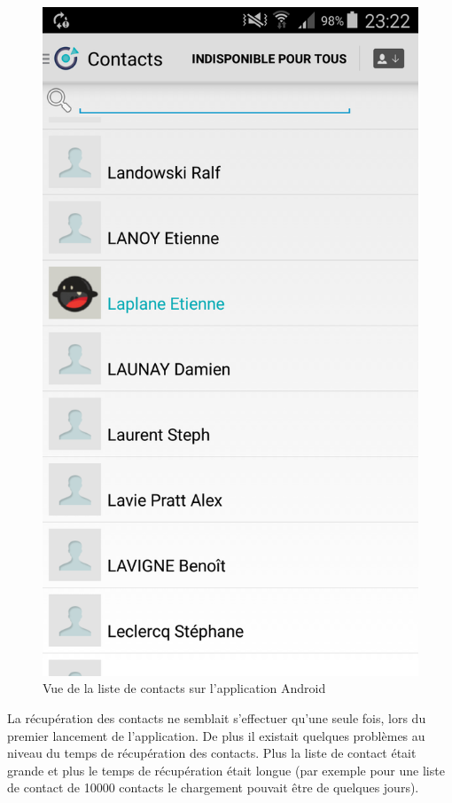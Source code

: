 \begin{figure}[!h]
	\centering
	\includegraphics[scale=0.1]{img/contact.png}
	\caption{\label{contact} {Vue de la liste de contacts sur l'application Android}}
\end{figure}

La récupération des contacts ne semblait s'effectuer qu'une seule fois, lors du premier lancement de l'application. De plus il existait quelques problèmes au niveau du temps de récupération des contacts. Plus la liste de contact était grande et plus le temps de récupération était longue (par exemple pour une liste de contact de 10000 contacts le chargement pouvait être de quelques jours).\\

